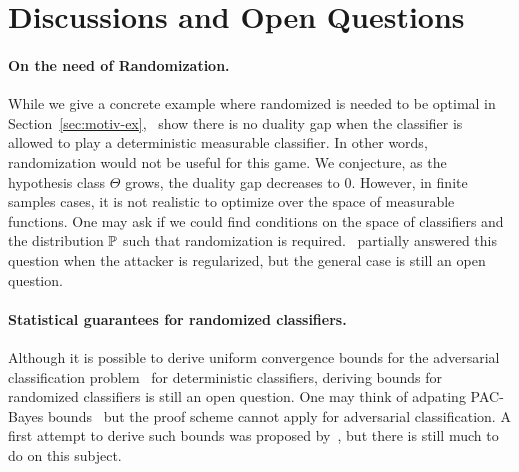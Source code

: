 \section{Discussions and Open Questions}


\paragraph{On the need of Randomization.} While we give a concrete example where randomized is needed to be optimal in Section~\ref{sec:motiv-ex},~\citep{pydi2021many} show there is no duality gap when the classifier is allowed to play a deterministic measurable classifier. In other words, randomization would not be useful for this game. We conjecture, as the hypothesis class $\Theta$ grows, the duality gap decreases to $0$. However, in finite samples cases, it is not realistic to optimize over the space of measurable functions. One may ask if we could find conditions on the space of classifiers and the distribution $\mathbb{P}$ such that randomization is required.~\citet{pinot2020randomization} partially answered this question when the attacker is regularized, but the general case is still an open question.

\paragraph{Statistical guarantees for randomized classifiers.} Although it is possible to derive uniform convergence bounds for the adversarial classification problem~\citep{yin2019rademacher,awasthi2020adversarial} for deterministic classifiers, deriving bounds for randomized classifiers is still an open question. One may think of adpating PAC-Bayes bounds~\citep{xxx} but the proof scheme cannot apply for adversarial classification. A first attempt to derive such bounds was proposed by~\citet{viallard2021pac}, but there is still much to do on this subject.


